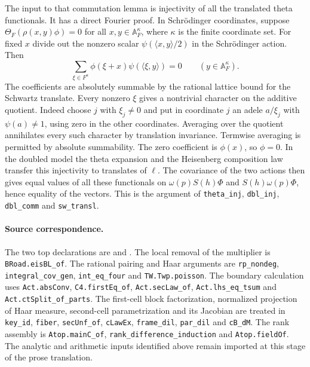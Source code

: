 The input to that commutation lemma is injectivity of all the
translated theta functionals. It has a direct Fourier proof.
In Schr\"odinger coordinates, suppose
\(\Theta_F(\rho(x,y)\phi)=0\) for all \(x,y\in\mathbb A_F^\kappa\),
where \(\kappa\) is the finite coordinate set. For fixed \(x\)
divide out the nonzero scalar \(\psi(\langle x,y\rangle/2)\)
in the Schr\"odinger action. Then
\[
    \sum_{\xi\in F^\kappa}\phi(\xi+x)
                    \psi(\langle\xi,y\rangle)=0
                \qquad(y\in\mathbb A_F^\kappa).
\]
The coefficients are absolutely summable by the rational lattice
bound for the Schwartz translate. Every nonzero \(\xi\) gives a
nontrivial character on the additive quotient. Indeed choose
\(j\) with \(\xi_j\ne0\) and put in coordinate \(j\) an adele
\(a/\xi_j\) with \(\psi(a)\ne1\), using zero in the other
coordinates. Averaging over the quotient annihilates every such
character by translation invariance. Termwise averaging is
permitted by absolute summability. The zero coefficient is
\(\phi(x)\), so \(\phi=0\). In the doubled model the theta
expansion and the Heisenberg composition law transfer this
injectivity to translates of \(\ell\). The covariance of the two
actions then gives equal values of all these functionals on
\(\omega(p)S(h)\Phi\) and \(S(h)\omega(p)\Phi\), hence equality
of the vectors. This is the argument of \texttt{theta\_inj},
\texttt{dbl\_inj}, \texttt{dbl\_comm} and \texttt{sw\_transl}.

\paragraph{Source correspondence.}
The two top declarations are
 and
. The local removal
of the multiplier is \texttt{BRoad.eisBL\_of}. The rational
pairing and Haar arguments are \texttt{rp\_nondeg},
\texttt{integral\_cov\_gen}, \texttt{int\_eq\_four} and
\texttt{TW.Twp.poisson}. The boundary calculation uses
\texttt{Act.absConv}, \texttt{C4.firstEq\_of},
\texttt{Act.secLaw\_of}, \texttt{Act.lhs\_eq\_tsum} and
\texttt{Act.ctSplit\_of\_parts}. The first-cell block
factorization, normalized projection of Haar measure, second-cell
parametrization and its Jacobian are treated in
\texttt{key\_id}, \texttt{fiber}, \texttt{secUnf\_of},
\texttt{cLawEx}, \texttt{frame\_dil}, \texttt{par\_dil} and
\texttt{cB\_dM}. The rank assembly is
\texttt{Atop.mainC\_of}, \texttt{rank\_difference\_induction}
and \texttt{Atop.fieldOf}. The analytic and arithmetic inputs
identified above remain imported at this stage of the prose
translation.
